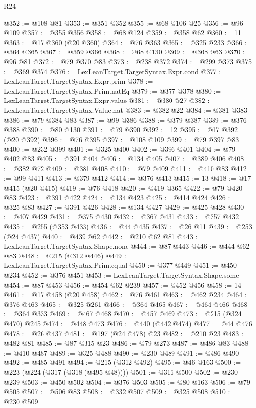 \begin{lexlean}{R24}
\begin{coremodule}
@352 := @108 @81
@353 := @351 @352
@355 := @68 @106 @25
@356 := @96 @109
@357 := @355 @356
@358 := @68 @124
@359 := @358 @62
@360 := 11
@363 := @17 @360 (@20 @360)
@364 := @76 @363
@365 := @325 @233
@366 := @364 @365
@367 := @359 @366
@368 := @68 @130
@369 := @368 @63
@370 := @96 @81
@372 := @79 @370 @83
@373 := @238 @372
@374 := @299 @373
@375 := @369 @374
@376 := LexLeanTarget.TargetSyntax.Expr.cond
@377 := LexLeanTarget.TargetSyntax.Expr.prim
@378 := LexLeanTarget.TargetSyntax.Prim.natEq
@379 := @377 @378
@380 := LexLeanTarget.TargetSyntax.Expr.value
@381 := @380 @27
@382 := LexLeanTarget.TargetSyntax.Value.nat
@383 := @382 @22
@384 := @381 @383
@386 := @79 @384 @83
@387 := @99 @386
@388 := @379 @387
@389 := @376 @388
@390 := @80 @130
@391 := @79 @390
@392 := 12
@395 := @17 @392 (@20 @392)
@396 := @76 @395
@397 := @108 @109
@399 := @79 @397 @83
@400 := @232 @399
@401 := @325 @400
@402 := @396 @401
@404 := @79 @402 @83
@405 := @391 @404
@406 := @134 @405
@407 := @389 @406
@408 := @382 @72
@409 := @381 @408
@410 := @79 @409
@411 := @410 @83
@412 := @99 @411
@413 := @379 @412
@414 := @376 @413
@415 := 13
@418 := @17 @415 (@20 @415)
@419 := @76 @418
@420 := @419 @365
@422 := @79 @420 @83
@423 := @391 @422
@424 := @134 @423
@425 := @414 @424
@426 := @325 @83
@427 := @391 @426
@428 := @134 @427
@429 := @425 @428
@430 := @407 @429
@431 := @375 @430
@432 := @367 @431
@433 := @357 @432
@435 := @255 (@353 @433)
@436 := @44 @435
@437 := @26 @11
@439 := @253 (@24 @437)
@440 := @439 @62
@442 := @210 @62 @81
@443 := LexLeanTarget.TargetSyntax.Shape.none
@444 := @87 @443
@446 := @444 @62 @83
@448 := @215 (@312 @446)
@449 := LexLeanTarget.TargetSyntax.Prim.equal
@450 := @377 @449
@451 := @450 @234
@452 := @376 @451
@453 := LexLeanTarget.TargetSyntax.Shape.some
@454 := @87 @453
@456 := @454 @62 @239
@457 := @452 @456
@458 := 14
@461 := @17 @458 (@20 @458)
@462 := @76 @461
@463 := @462 @234
@464 := @376 @463
@465 := @325 @261
@466 := @364 @465
@467 := @464 @466
@468 := @364 @333
@469 := @467 @468
@470 := @457 @469
@473 := @215 (@324 @470) @245
@474 := @448 @473
@476 := @440 (@442 @474)
@477 := @44 @476
@478 := @26 @437
@481 := @197 (@24 @478) @23
@482 := @210 @23
@483 := @482 @81
@485 := @87 @315 @23
@486 := @79 @273
@487 := @486 @83
@488 := @410 @487
@489 := @325 @488
@490 := @230 @489
@491 := @486 @490
@492 := @485 @491
@494 := @215 (@312 @492)
@495 := @46 @163
@500 := @223 (@224 (@317 (@318 (@495 @48))))
@501 := @316 @500
@502 := @230 @239
@503 := @450 @502
@504 := @376 @503
@505 := @80 @163
@506 := @79 @505
@507 := @506 @83
@508 := @332 @507
@509 := @325 @508
@510 := @230 @509

\end{coremodule}
\end{lexlean}
